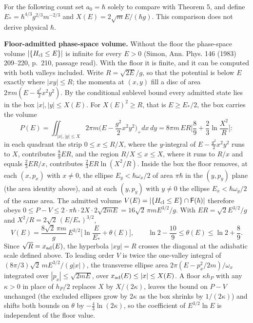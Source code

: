 \documentclass[11pt,a4paper]{article}
\begin{document}
For the following count set \(a_0=\hbar\) solely to compare with Theorem
5, and define \({E_*} =\hbar^{4/3}g^{2/3}m^{-2/3}\) and
\(X(E)=2\sqrt mE/(\hbar g)\). This comparison does not derive physical
\(\hbar\).

\textbf{Floor-admitted phase-space volume.} Without the floor the
phase-space volume \(|\{H_{\rm cl}\le E\}|\) is infinite for every
\(E>0\) (Simon, Ann. Phys. 146 (1983) 209--220, p.~210, passage read).
With the floor it is finite, and it can be computed with both valleys
included. Write \(R=\sqrt{2E}/g\), so that the potential is below \(E\)
exactly where \(|xy|\le R\); the momenta at \((x,y)\) fill a disc of
area \(2\pi m(E-\tfrac{g^2}{2}x^2y^2)\). By the conditional sublevel
bound every admitted state lies in the box \(|x|,|y|\le X(E)\). For
\(X(E)^2\ge R\), that is \(E\ge{E_*}/2\), the box carries the volume
\[P(E)=\iint_{|x|,|y|\le X}2\pi m\Big(E-\frac{g^2}{2}x^2y^2\Big)_+dx\,dy
=8\pi m\,ER\Big[\frac89+\frac23\ln\frac{X^2}{R}\Big]:\] in each quadrant
the strip \(0\le x\le R/X\), where the \(y\)-integral of
\(E-\tfrac{g^2}2x^2y^2\) runs to \(X\), contributes \(\tfrac89ER\), and
the region \(R/X\le x\le X\), where it runs to \(R/x\) and equals
\(\tfrac23ER/x\), contributes \(\tfrac23ER\ln(X^2/R)\). Inside the box
the floor removes, at each \((x,p_x)\) with \(x\ne0\), the ellipse
\(E_y<\hbar\omega_x/2\) of area \(\pi\hbar\) in the \((y,p_y)\) plane
(the area identity above), and at each \((y,p_y)\) with \(y\ne0\) the
ellipse \(E_x<\hbar\omega_y/2\) of the same area. The admitted volume
\(V(E)=|\{H_{\rm cl}\le E\}\cap\mathsf F(\hbar)|\) therefore obeys
\(0\le P-V\le2\cdot\pi\hbar\cdot2X\cdot2\sqrt{2mE}=16\sqrt2\,\pi mE^{3/2}/g\).
With \(ER=\sqrt2E^{3/2}/g\) and \(X^2/R=2\sqrt2\,(E/{E_*})^{3/2}\),
\[V(E)=\frac{8\sqrt2\,\pi m}{g}\,E^{3/2}\Big[\ln\frac E{E_*}+\theta(E)\Big],
\qquad\ln2-\frac{10}9\le\theta(E)\le\ln2+\frac89 .\] Since
\(\sqrt R=x_{\rm ad}(E)\), the hyperbola \(|xy|=R\) crosses the diagonal
at the adiabatic scale defined above. To leading order \(V\) is twice
the one-valley integral of \((8\pi/3)\sqrt2\,mE^{3/2}/(g|x|)\), the
transverse ellipse area \(2\pi(E-p_x^2/2m)/\omega_x\) integrated over
\(|p_x|\le\sqrt{2mE}\), over \(x_{\rm ad}(E)\le|x|\le X(E)\). A floor
\(\kappa h_P\) with any \(\kappa>0\) in place of \(h_P/2\) replaces
\(X\) by \(X/(2\kappa)\), leaves the bound on \(P-V\) unchanged (the
excluded ellipses grow by \(2\kappa\) as the box shrinks by
\(1/(2\kappa)\)) and shifts both bounds on \(\theta\) by
\(-\tfrac43\ln(2\kappa)\), so the coefficient of \(E^{3/2}\ln E\) is
independent of the floor value.
\end{document}
